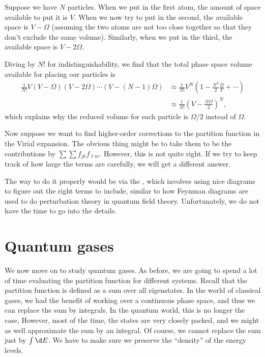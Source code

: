 \documentclass[a4paper]{article}
\begin{document}
Suppose we have $N$ particles. When we put in the first atom, the amount of space available to put it is $V$. When we now try to put in the second, the available space is $V - \Omega$ (assuming the two atoms are not too close together so that they don't exclude the same volume). Similarly, when we put in the third, the available space is $V - 2 \Omega$.

Diving by $N!$ for indistinguishability, we find that the total phase space volume available for placing our particles is
\begin{align*}
  \frac{1}{N!}V(V - \Omega) (V -2\Omega) \cdots (V - (N - 1) \Omega) &\approx \frac{1}{N!} V^N\left(1 - \frac{N^2}{2} \frac{\Omega}{V} + \cdots\right)\\
  &\approx \frac{1}{N!} \left(V - \frac{N\Omega}{2}\right)^N,
\end{align*}
which explains why the reduced volume for each particle is $\Omega/2$ instead of $\Omega$.

Now suppose we want to find higher-order corrections to the partition function in the Virial expansion. The obvious thing might be to take them to be the contributions by $\sum \sum f_{jk} f_{\ell m}$. However, this is not quite right. If we try to keep track of how large the terms are carefully, we will get a different answer.

The way to do it properly would be via the , which involves using nice diagrams to figure out the right terms to include, similar to how Feynman diagrams are used to do perturbation theory in quantum field theory. Unfortunately, we do not have the time to go into the details.

\section{Quantum gases}
We now move on to study quantum gases. As before, we are going to spend a lot of time evaluating the partition function for different systems. Recall that the partition function is defined as a sum over all eigenstates. In the world of classical gases, we had the benefit of working over a continuous phase space, and thus we can replace the sum by integrals. In the quantum world, this is no longer the case, However, most of the time, the states are very closely packed, and we might as well approximate the sum by an integral. Of course, we cannot replace the sum just by $\int \d E$. We have to make sure we preserve the ``density'' of the energy levels.
\end{document}

